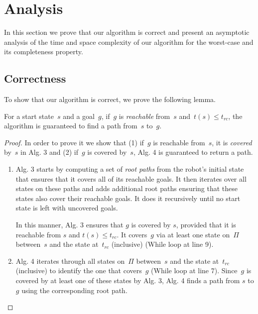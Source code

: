 \documentclass[a4paper]{report}
\begin{document}
\section{Analysis}
In this section we prove that our algorithm is correct and present an asymptotic analysis of the time and space complexity of our algorithm for the worst-case and its completeness property.

\subsection{Correctness}
To show that our algorithm is correct, we prove the following lemma.

\vspace{2mm}
\begin{lemma}
For a start state~$s$ and a goal~$g$, if~$g$ is \emph{reachable} from~$s$ and~$t(s) \leq t_{rc}$, the algorithm is guaranteed to find a path from~$s$ to~$g$.
\end{lemma}

\begin{proof}
In order to prove it we show that (1) if~$g$ is reachable from~$s$, it is \emph{covered} by~$s$ in Alg. 3 and (2) if~$g$ is covered by~$s$, Alg. 4 is guaranteed to return a path.

\begin{enumerate}
    \item Alg. 3 starts by computing a set of \emph{root paths} from the robot's initial state that ensures that it covers all of its reachable goals. It then iterates over all states on these paths and adds additional root paths ensuring that these states also cover their reachable goals. It does it recursively until no start state is left with uncovered goals.
    
    In this manner, Alg. 3 ensures that $g$ is covered by $s$, provided that it is reachable from $s$ and $t(s) \leq t_{rc}$. It covers~$g$ via at least one state on~$\Pi$ between~$s$ and the state at~$t_{rc}$ (inclusive) (While loop at line 9).
    \item Alg. 4 iterates through all states on~$\Pi$  between~$s$ and the state at~$t_{rc}$ (inclusive) to identify the one that covers~$g$ (While loop at line 7). Since~$g$ is covered by at least one of these states by Alg. 3, Alg. 4 finds a path from $s$ to $g$ using the corresponding root path.

\end{enumerate}
\end{proof}
\end{document}
